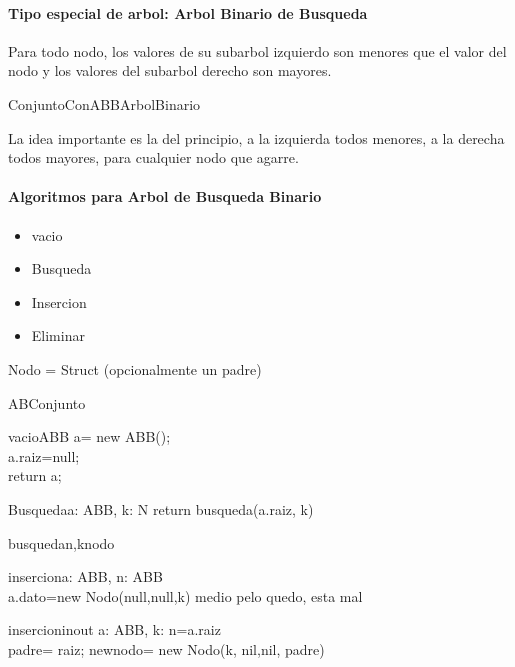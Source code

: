 \documentclass[a4paper,10pt]{article}
\begin{document}
\paragraph*{Tipo especial de arbol: Arbol Binario de Busqueda} Para todo nodo, los valores de su subarbol izquierdo son menores que el valor del nodo y los valores del subarbol derecho son mayores.
\begin{design}{ConjuntoConABB}{ArbolBinario}
\end{design}
La idea importante es la del principio, a la izquierda todos menores, a la derecha todos mayores, para cualquier nodo que agarre.
\paragraph*{Algoritmos para Arbol de Busqueda Binario}
\begin{itemize}
    \item vacio
    \item Busqueda
    \item Insercion
    \item Eliminar
\end{itemize}
Nodo = Struct  (opcionalmente un padre)
\begin{design}{AB}{Conjunto}
\begin{impl}{vacio}{}{ABB}
a= new ABB();
\\a.raiz=null;
\\return a;
\end{impl}
\begin{impl}{Busqueda}{a: ABB, k: N}{}
    return busqueda(a.raiz, k)
\end{impl}
\begin{impl}{busqueda}{n,k}{nodo}
\end{impl}
\begin{impl}{insercion}{a: ABB, n: \nat}{ABB}
\\a.dato=new Nodo(null,null,k)
{\color{red}medio pelo quedo, esta mal}
\end{impl}
\pagebreak
\begin{impl}{insercion}{inout a: ABB, k: \nat}{}
    n=a.raiz\\
    padre= raiz;
    newnodo= new Nodo(k, nil,nil, padre)
\end{impl}

\end{design}
\end{document}
